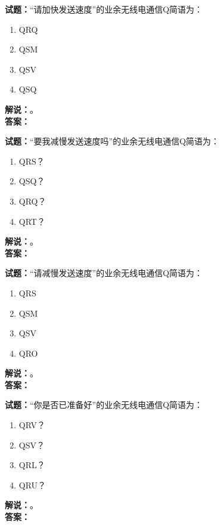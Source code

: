 \documentclass{ctexbook}
\begin{document}
\vspace{\baselineskip}

\noindent\textbf{试题：}“请加快发送速度”的业余无线电通信Q简语为：
\begin{enumerate}[leftmargin=3em]
  \item QRQ
  \item QSM
  \item QSV
  \item QSQ
\end{enumerate}
\noindent\textbf{解说：}\textbf{}。\\\noindent\textbf{答案：}

\vspace{\baselineskip}

\noindent\textbf{试题：}“要我减慢发送速度吗”的业余无线电通信Q简语为：
\begin{enumerate}[leftmargin=3em]
  \item QRS？
  \item QSQ？
  \item QRQ？
  \item QRT？
\end{enumerate}
\noindent\textbf{解说：}\textbf{}。\\\noindent\textbf{答案：}

\vspace{\baselineskip}

\noindent\textbf{试题：}“请减慢发送速度”的业余无线电通信Q简语为：
\begin{enumerate}[leftmargin=3em]
  \item QRS
  \item QSM
  \item QSV
  \item QRO
\end{enumerate}
\noindent\textbf{解说：}\textbf{}。\\\noindent\textbf{答案：}

\vspace{\baselineskip}

\noindent\textbf{试题：}“你是否已准备好”的业余无线电通信Q简语为：
\begin{enumerate}[leftmargin=3em]
  \item QRV？
  \item QSV？
  \item QRL？
  \item QRU？
\end{enumerate}
\noindent\textbf{解说：}\textbf{}。\\\noindent\textbf{答案：}
\end{document}
